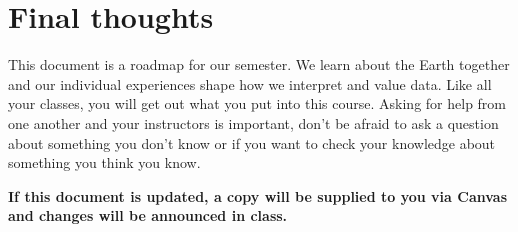 \documentclass[11pt,]{article}
\begin{document}
\hypertarget{final-thoughts}{%
\section{Final thoughts}\label{final-thoughts}}

This document is a roadmap for our semester. We learn about the Earth
together and our individual experiences shape how we interpret and value
data. Like all your classes, you will get out what you put into this
course. Asking for help from one another and your instructors is
important, don't be afraid to ask a question about something you don't
know or if you want to check your knowledge about something you think
you know.

\textbf{If this document is updated, a copy will be supplied to you via
Canvas and changes will be announced in class.}
\end{document}
